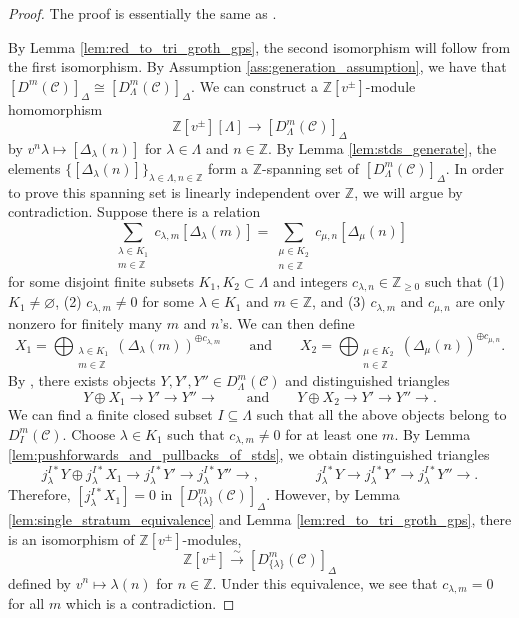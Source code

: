 \documentclass{amsart}
\newcommand{\Z}{\mathbb{Z}}
\newcommand{\scrC}{\mathcal{C}}
\renewcommand{\emptyset}{\varnothing}
\theoremstyle{definition}
\numberwithin{equation}{subsection}
\begin{document}
\begin{proof}
    The proof is essentially the same as \cite[Theorem 6.13]{ARV}.

    By Lemma \ref{lem:red_to_tri_groth_gps}, the second isomorphism will follow from the first isomorphism.
    By Assumption \ref{ass:generation_assumption}, we have that $[D^m (\scrC)]_{\Delta} \cong [D_{\Lambda}^m (\scrC)]_{\Delta}$.
    We can construct a $\Z [v^{\pm}]$-module homomorphism
    \[\Z[v^{\pm}] [\Lambda] \to [D_{\Lambda}^m (\scrC)]_{\Delta}\]
    by $v^n \lambda \mapsto [\Delta_{\lambda} (n)]$ for $\lambda \in \Lambda$ and $n \in \Z$.
    By Lemma \ref{lem:stds_generate}, the elements $\{ [\Delta_{\lambda} (n)]\}_{\lambda \in \Lambda, n \in \Z}$ form a $\Z$-spanning set of $[D_{\Lambda}^m (\scrC)]_{\Delta}$.
    In order to prove this spanning set is linearly independent over $\Z$, we will argue by contradiction. Suppose there is a relation
    \[\sum_{\substack{\lambda \in K_1 \\ m \in \Z}} c_{\lambda, m} [\Delta_{\lambda} (m)] = \sum_{\substack{\mu \in K_2 \\ n \in \Z}} c_{\mu, n} [\Delta_{\mu} (n)]\]
    for some disjoint finite subsets $K_1, K_2 \subset \Lambda$ and integers $c_{\lambda, n} \in \Z_{\geq 0}$ such that (1) $K_1 \neq \emptyset$, (2) $c_{\lambda, m} \neq 0$ for some $\lambda \in K_1$ and $m \in \Z$, and (3) $c_{\lambda, m}$ and $c_{\mu, n}$ are only nonzero for finitely many $m$ and $n$'s. 
    We can then define
    \[X_1 = \bigoplus_{\substack{\lambda \in K_1 \\ m \in \Z}} \left( \Delta_{\lambda} (m)\right)^{\oplus c_{\lambda, m}} \qquad\text{and}\qquad X_2 = \bigoplus_{\substack{\mu \in K_2 \\ n \in \Z}} \left( \Delta_{\mu} (n)\right)^{\oplus c_{\mu, n}}.\]
    By \cite[Lemma 2.6]{Th}, there exists objects $Y, Y', Y'' \in D_{\Lambda}^m (\scrC)$ and distinguished triangles
    \[Y \oplus X_1 \to Y' \to Y'' \to \qquad\text{and}\qquad Y \oplus X_2 \to Y' \to Y'' \to.\]
    We can find a finite closed subset $I \subseteq \Lambda$ such that all the above objects belong to $D_I^m (\scrC)$.
    Choose $\lambda \in K_1$ such that $c_{\lambda, m} \neq 0$ for at least one $m$. By Lemma \ref{lem:pushforwards_and_pullbacks_of_stds}, we obtain distinguished triangles
    \[ j_{\lambda}^{I*} Y \oplus j_{\lambda}^{I*} X_1 \to j_{\lambda}^{I*} Y' \to j_{\lambda}^{I*} Y'' \to, \qquad\qquad j_{\lambda}^{I*} Y  \to j_{\lambda}^{I*} Y' \to j_{\lambda}^{I*} Y'' \to.\]
    Therefore, $[j_{\lambda}^{I*} X_1 ] = 0$ in $[D_{\{\lambda\}}^m (\scrC)]_{\Delta}$.
    However, by Lemma \ref{lem:single_stratum_equivalence} and Lemma \ref{lem:red_to_tri_groth_gps}, there is an isomorphism of $\Z[v^{\pm}]$-modules, 
    \[ \Z[v^{\pm}] \stackrel{\sim}{\to} [D_{\{\lambda\}}^m (\scrC)]_{\Delta}\]
    defined by $v^n \mapsto \lambda (n)$ for $n \in \Z$. Under this equivalence, we see that $c_{\lambda, m} = 0$ for all $m$ which is a contradiction.
\end{proof}
\end{document}
